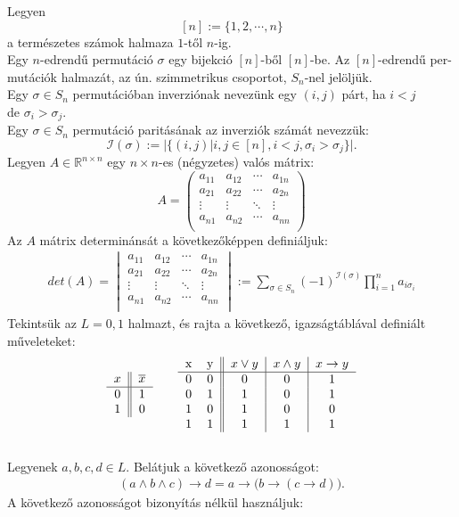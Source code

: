\documentclass{article}
\begin{document}
Legyen
\[[n] := \{1,2,\cdots,n\} \]
a természetes számok halmaza $1$-től $n$-ig. \\
Egy $n$-edrendű permutáció $\sigma$ egy bijekció $[n]$-ből $[n]$-be. Az $[n]$-edrendű per-\\
mutációk halmazát, az ún. szimmetrikus csoportot, $S_{n}$-nel jelöljük.\\
Egy $\sigma \in S_{n}$ permutációban inverziónak nevezünk egy $(i,j)$ párt, ha $i < j$\\
de $\sigma_{i} > \sigma_{j}$.\\
Egy $\sigma \in S_{n}$ permutáció paritásának az inverziók számát nevezzük:\\
\[\mathcal{I}(\sigma):= \Bigr|\bigr\{ (i,j)\bigr|i,j \in [n],i<j,\sigma_i > \sigma_j \bigr\}\Bigr|.\]
Legyen $A \in \mathbb{R}^{n\times n}$ egy $n \times n$-es (négyzetes) valós mátrix:
\[A =\left( \begin{matrix}
a_{11} & a_{12} & \cdots & a_{1n}\\
a_{21} & a_{22} & \cdots & a_{2n}\\
\vdots & \vdots & \ddots & \vdots\\
a_{n1} & a_{n2} & \cdots & a_{nn}\\
\end{matrix}\right)\]
Az $A$ mátrix determinánsát a következőképpen definiáljuk:
\begin{gather}det(A) = \begin{vmatrix*}
a_{11} & a_{12} & \cdots & a_{1n}\\
a_{21} & a_{22} & \cdots & a_{2n}\\
\vdots & \vdots & \ddots & \vdots\\
a_{n1} & a_{n2} & \cdots & a_{nn}\\
\end{vmatrix*}:= \sum_{\sigma \in S_n} (-1)^{\mathcal{I}(\sigma)} \prod_{i=1}^n a_{i\sigma_i}\end{gather}
\smallbreak Tekintsük az $L={0,1}$ halmazt, és rajta a következő, igazságtáblával definiált műveleteket:\\
\[
\begin{tabular}{c||c}
$x$ & $\overline{x}$ \\ \hline
0 & 1 \\
1 & 0 \\
\end{tabular} \hspace{20pt}
\begin{tabular}{cc||c|c|c}
x & y & $x\vee y$ & $x\wedge y$ & $x\rightarrow y$ \\ \hline
0 & 0 & 0 & 0 & 1 \\
0 & 1 & 1 & 0 & 1 \\
1 & 0 & 1 & 0 & 0 \\
1 & 1 & 1 & 1 & 1 \\

\end{tabular}
\]\\
Legyenek $a,b,c,d \in L $. Belátjuk a következő azonosságot:
\begin{gather}\label{harmas}
(a\wedge b\wedge c)\rightarrow d = a \rightarrow \bigr(b\rightarrow (c\rightarrow d)\bigr).
\end{gather}
A következő azonosságot bizonyítás nélkül használjuk:
\end{document}
